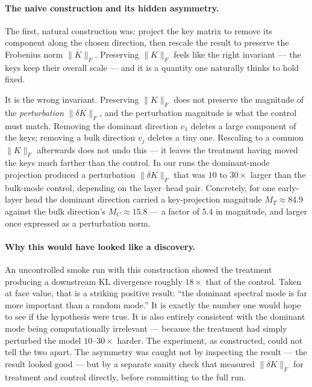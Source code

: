 \documentclass[11pt]{article}
\begin{document}
\paragraph{The naive construction and its hidden asymmetry.}
The first, natural construction was: project the key matrix to remove its
component along the chosen direction, then rescale the result to preserve
the Frobenius norm $\|K\|_F$. Preserving $\|K\|_F$ feels like the right
invariant --- the keys keep their overall scale --- and it is a quantity
one naturally thinks to hold fixed.

It is the wrong invariant. Preserving $\|K\|_F$ does not preserve the
magnitude of the \emph{perturbation} $\|\delta K\|_F$, and the
perturbation magnitude is what the control must match. Removing the
dominant direction $v_1$ deletes a large component of the keys; removing a
bulk direction $v_j$ deletes a tiny one. Rescaling to a common $\|K\|_F$
afterwards does not undo this --- it leaves the treatment having moved the
keys much farther than the control. In our runs the dominant-mode
projection produced a perturbation $\|\delta K\|_F$ that was $10$ to
$30\times$ larger than the bulk-mode control, depending on the
layer--head pair. Concretely, for one early-layer head the dominant
direction carried a key-projection magnitude $M_T\approx 84.9$ against the
bulk direction's $M_C\approx 15.8$ --- a factor of $5.4$ in magnitude, and
larger once expressed as a perturbation norm.

\paragraph{Why this would have looked like a discovery.}
An uncontrolled smoke run with this construction showed the treatment
producing a downstream KL divergence roughly $18\times$ that of the
control. Taken at face value, that is a striking positive result: ``the
dominant spectral mode is far more important than a random mode.'' It is
exactly the number one would hope to see if the hypothesis were true. It
is also entirely consistent with the dominant mode being computationally
irrelevant --- because the treatment had simply perturbed the model
$10$--$30\times$ harder. The experiment, as constructed, could not tell
the two apart. The asymmetry was caught not by inspecting the result ---
the result looked good --- but by a separate sanity check that measured
$\|\delta K\|_F$ for treatment and control directly, before committing to
the full run.

\end{document}
